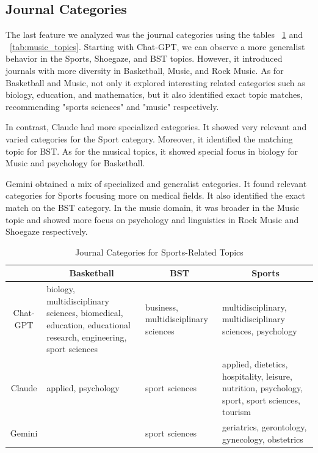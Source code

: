 \documentclass[runningheads]{llncs}
\begin{document}
\subsection{Journal Categories}

The last feature we analyzed was the journal categories using the tables ~\ref{tab:sports_topics} and ~\ref{tab:music_topics}. Starting with Chat-GPT, we can observe a more generalist behavior in the Sports, Shoegaze, and BST topics. However, it introduced journals with more diversity in Basketball, Music, and Rock Music. As for Basketball and Music, not only it explored interesting related categories such as biology, education, and mathematics, but it also identified exact topic matches, recommending "sports sciences" and "music" respectively.

In contrast, Claude had more specialized categories. It showed very relevant and varied categories for the Sport category. Moreover, it identified the matching topic for BST. As for the musical topics, it showed special focus in biology for Music and psychology for Basketball.

Gemini obtained a mix of specialized and generalist categories. It found relevant categories for Sports focusing more on medical fields. It also identified the exact match on the BST category. In the music domain, it was broader in the Music topic and showed more focus on psychology and linguistics in Rock Music and Shoegaze respectively.

\begin{table}[ht]
\scriptsize
\centering
\begin{tabular}{|c|p{3cm}|p{3cm}|p{3cm}|}
\hline
 & \multicolumn{1}{c|}{\textbf{Basketball}} & \multicolumn{1}{c|}{\textbf{BST}} & \multicolumn{1}{c|}{\textbf{Sports}} \\ \hline
Chat-GPT & biology, multidisciplinary sciences, biomedical, education, educational research, engineering, sport sciences & business, multidisciplinary sciences & multidisciplinary, multidisciplinary sciences, psychology \\ \hline
Claude & applied, psychology & sport sciences & applied, dietetics, hospitality, leisure, nutrition, psychology, sport, sport sciences, tourism \\ \hline
Gemini &  & sport sciences & geriatrics, gerontology, gynecology, obstetrics \\ \hline
\end{tabular}
\caption{Journal Categories for Sports-Related Topics}
\label{tab:sports_topics}
\end{table}
\end{document}
